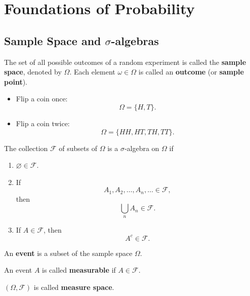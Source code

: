\chapter{Foundations of Probability}
\section{Sample Space and $\sigma$-algebras}

\begin{definitionenv}
    The set of all possible outcomes of a random experiment is called the
    \textbf{sample space}, denoted by $\Omega$.
    Each element $\omega\in\Omega$ is called an \textbf{outcome}
    (or \textbf{sample point}).
\end{definitionenv}

\begin{exampleenv}
    \begin{itemize}
        \item Flip a coin once:
        $$
        \Omega=\{H,T\}.
        $$

        \item Flip a coin twice:
        $$
        \Omega=\{HH,HT,TH,TT\}.
        $$
    \end{itemize}
\end{exampleenv}

\begin{definitionenv}
    The collection $\mathcal{F}$ of subsets of $\Omega$ is a
    $\sigma$-algebra on $\Omega$ if
    \begin{enumerate}[label=(\alph*)]
        \item $\varnothing\in\mathcal{F}$.

        \item If
        $$
        A_1,A_2,\ldots,A_n,\ldots\in\mathcal{F},
        $$
        then
        $$
        \bigcup_{n}A_n\in\mathcal{F}.
        $$

        \item If $A\in\mathcal{F}$, then
        $$
        A^c\in\mathcal{F}.
        $$
    \end{enumerate}
    An \textbf{event} is a subset of the sample space $\Omega$.

    An event $A$ is called \textbf{measurable} if $A\in\mathcal{F}.$

    $(\Omega,\mathcal{F})$ is called \textbf{measure space}.
\end{definitionenv}

